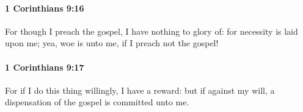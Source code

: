 		\paragraph{1 Corinthians 9:16} %
			\label{1CORINTHIANS-9-16}

			For though I preach the gospel, I have nothing to glory of: for necessity is laid upon me; yea, woe is unto me, if I preach not the gospel!

			\begin{framed}
			\scriptsize
				\begin{compactdesc}
					\item[SBLG] 
				\end{compactdesc}
			\end{framed}

		\paragraph{1 Corinthians 9:17} %
			\label{1CORINTHIANS-9-17}

			For if I do this thing willingly, I have a reward: but if against my will, a dispensation of the gospel is committed unto me.

